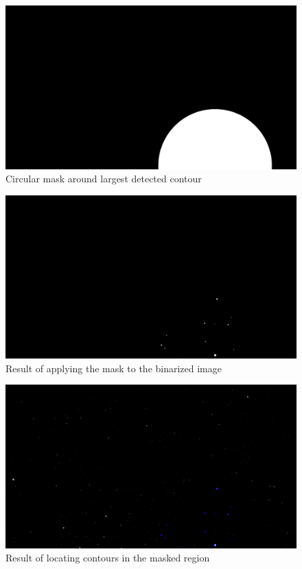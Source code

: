 \documentclass[10pt,twocolumn,letterpaper]{article}
\begin{document}
\begin{figure}[h]
  \centering
   \includegraphics[width=0.9\linewidth]{mask}
   \caption{Circular mask around largest detected contour}
   \label{fig:star_mask}
\end{figure}

\begin{figure}[h]
  \centering
   \includegraphics[width=0.9\linewidth]{masked}
   \caption{Result of applying the mask to the binarized image}
   \label{fig:star_masked}
\end{figure}

\begin{figure}[h]
  \centering
   \includegraphics[width=0.9\linewidth]{local_contours}
   \caption{Result of locating contours in the masked region}
   \label{fig:star_local_contours}
\end{figure}
\end{document}
